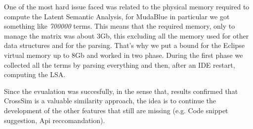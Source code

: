 One of the most hard issue faced was related to the physical memory required to compute the Latent Semantic Analysis, for MudaBlue in particular we got something like \emph{700000} terms. This means that the required memory, only to manage the matrix was about 3Gb, this excluding all the memory used for other data structures and for the parsing. That's why we put a bound for the Eclipse virtual memory up to 8Gb and worked in two phase. During the first phase we collected all the terms by parsing everything and then, after an IDE restart, computing the LSA.

Since the evualation was succesfully, in the sense that, results confirmed that CrossSim is a valuable similarity approach, the idea is to continue the development of the other features that still are missing (e.g. Code snippet suggestion, Api reccomandation).